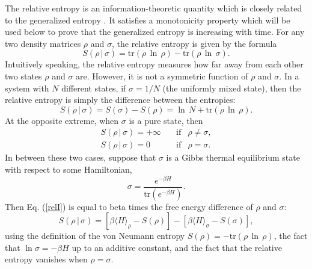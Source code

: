 \documentclass{article}
\begin{document}
The relative entropy is an information-theoretic quantity which is closely related to the generalized entropy \cite{casini08}.  It satisfies a monotonicity property which will be used below to prove that the generalized entropy is increasing with time.  For any two density matrices $\rho$ and $\sigma$, the relative entropy is given by the formula
\begin{equation}\label{relI}
S(\rho\,|\,\sigma) = \mathrm{tr}(\rho\,\ln\,\rho) - \mathrm{tr}(\rho\,\ln\,\sigma).
\end{equation}
Intuitively speaking, the relative entropy measures how far away from each other two states $\rho$ and $\sigma$ are.  However, it is not a symmetric function of $\rho$ and $\sigma$.  In a system with $N$ different states, if $\sigma = 1/N$ (the uniformly mixed state), then the relative entropy is simply the difference between the entropies:
\begin{equation}
S(\rho\,|\,\sigma) = S(\sigma) - S(\rho) = \ln\,N + \mathrm{tr}(\rho\,\ln\,\rho).
\end{equation}
At the opposite extreme, when $\sigma$ is a pure state, then
\begin{eqnarray}
S(\rho\,|\,\sigma) = +\infty & \quad \mathrm{if} & \rho \ne \sigma, \\
S(\rho\,|\,\sigma) = 0 & \quad \mathrm{if} & \rho = \sigma.
\end{eqnarray}
In between these two cases, suppose that $\sigma$ is a Gibbs thermal equilibrium state with respect to some Hamiltonian,
\begin{equation}\label{Gibbs}
\sigma = \frac{e^{-\beta H}}{\mathrm{tr}(e^{-\beta H})}.
\end{equation}
Then Eq. (\ref{relI}) is equal to beta times the free energy difference of $\rho$ and $\sigma$:
\begin{equation}\label{Hafe}
S(\rho\,|\,\sigma) = 
[\beta\langle H \rangle_\rho -  S(\rho)] - [\beta\langle H \rangle_\sigma - S(\sigma)],
\end{equation}
using the definition of the von Neumann entropy $S(\rho) = -\mathrm{tr}(\rho\,\ln\,\rho)$, the fact that $\ln \sigma = -\beta H$ up to an additive constant, and the fact that the relative entropy vanishes when $\rho = \sigma$.
\end{document}
